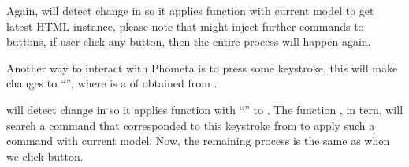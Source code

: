 \documentclass[master.tex]{subfiles}
\begin{document}
Again,  will detect change in  so it
applies function  with current model to get latest HTML instance,
please note that  might inject further commands to buttons, if
user click any button, then the entire process will happen again.

Another way to interact with Phometa is to press some keystroke, this will make
 changes to ``'', where
 is a  of  obtained from
.

 will detect change in  so it applies
function  with ``'' to
. The function , in tern, will search a
command that corresponded to this keystroke from  to
apply such a command with current model. Now, the remaining process is the same
as when we click button.





\end{document}

